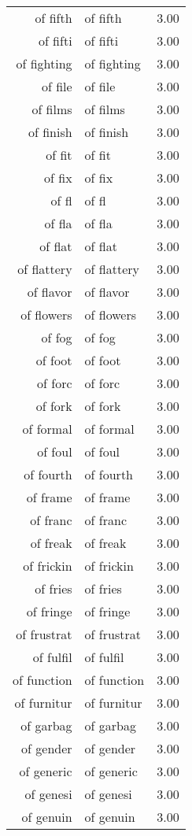 \begin{table}[ht]
\begin{tabular}{rlr}
  of fifth & of fifth & 3.00 \\ 
  of fifti & of fifti & 3.00 \\ 
  of fighting & of fighting & 3.00 \\ 
  of file & of file & 3.00 \\ 
  of films & of films & 3.00 \\ 
  of finish & of finish & 3.00 \\ 
  of fit & of fit & 3.00 \\ 
  of fix & of fix & 3.00 \\ 
  of fl & of fl & 3.00 \\ 
  of fla & of fla & 3.00 \\ 
  of flat & of flat & 3.00 \\ 
  of flattery & of flattery & 3.00 \\ 
  of flavor & of flavor & 3.00 \\ 
  of flowers & of flowers & 3.00 \\ 
  of fog & of fog & 3.00 \\ 
  of foot & of foot & 3.00 \\ 
  of forc & of forc & 3.00 \\ 
  of fork & of fork & 3.00 \\ 
  of formal & of formal & 3.00 \\ 
  of foul & of foul & 3.00 \\ 
  of fourth & of fourth & 3.00 \\ 
  of frame & of frame & 3.00 \\ 
  of franc & of franc & 3.00 \\ 
  of freak & of freak & 3.00 \\ 
  of frickin & of frickin & 3.00 \\ 
  of fries & of fries & 3.00 \\ 
  of fringe & of fringe & 3.00 \\ 
  of frustrat & of frustrat & 3.00 \\ 
  of fulfil & of fulfil & 3.00 \\ 
  of function & of function & 3.00 \\ 
  of furnitur & of furnitur & 3.00 \\ 
  of garbag & of garbag & 3.00 \\ 
  of gender & of gender & 3.00 \\ 
  of generic & of generic & 3.00 \\ 
  of genesi & of genesi & 3.00 \\ 
  of genuin & of genuin & 3.00 \\ 

\end{tabular}
\end{table}
